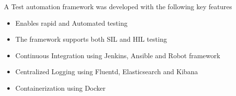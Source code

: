 \documentclass[10pt,a4paper,ragged2e,withhyper]{altacv}
\begin{document}
            A Test automation framework was developed with the following key features \linebreak
            \begin{itemize}
                \item Enables rapid and Automated testing
                \item The framework supports both SIL and HIL testing
                \item Continuous Integration using Jenkins, Ansible and Robot framework
                \item Centralized Logging using Fluentd, Elasticsearch and Kibana
                \item Containerization using Docker
            \end{itemize}
\end{document}
